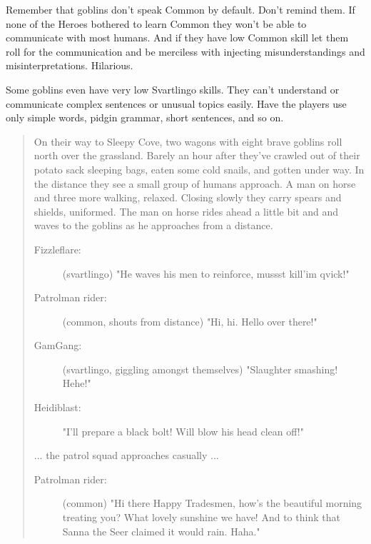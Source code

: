 Remember that goblins don't speak Common by default. Don't remind them. If none of the Heroes bothered to learn Common they won't be able to communicate with most humans. And if they have low Common skill let them roll for the communication and be merciless with injecting misunderstandings and misinterpretations. Hilarious. 

 \label{misunderstandings}
Some goblins even have very low Svartlingo skills. They can't understand or communicate complex sentences or unusual topics easily. Have the players use only simple words, pidgin grammar, short sentences, and so on.

\begin{quote}
\begin{small}

On their way to Sleepy Cove, two wagons with eight brave goblins roll north over the grassland. Barely an hour after they've crawled out of their potato sack sleeping bags, eaten some cold snails, and gotten under way. In the distance they see a small group of humans approach. A man on horse and three more walking, relaxed. Closing slowly they carry spears and shields, uniformed. The man on horse rides ahead a little bit and and waves to the goblins as he approaches from a distance.

\begin{description}

\item[Fizzleflare:] \vvsmall (svartlingo) \small
"He waves his men to reinforce, mussst kill'im qvick!"

\item[Patrolman rider:] \vvsmall (common, shouts from distance) \small 
"Hi, hi. Hello over there!"

\item[GamGang:] \vvsmall (svartlingo, giggling amongst themselves) \small 
"Slaughter smashing! Hehe!"

\item[Heidiblast:]
"I'll prepare a black bolt! Will blow his head clean off!"

\end{description}
... the patrol squad approaches casually ...
\begin{description}

\item[Patrolman rider:] \vvsmall (common) \small
"Hi there Happy Tradesmen, how's the beautiful morning treating you? What lovely sunshine we have! And to think that Sanna the Seer claimed it would rain. Haha."


\end{description}
\end{small}
\end{quote}

